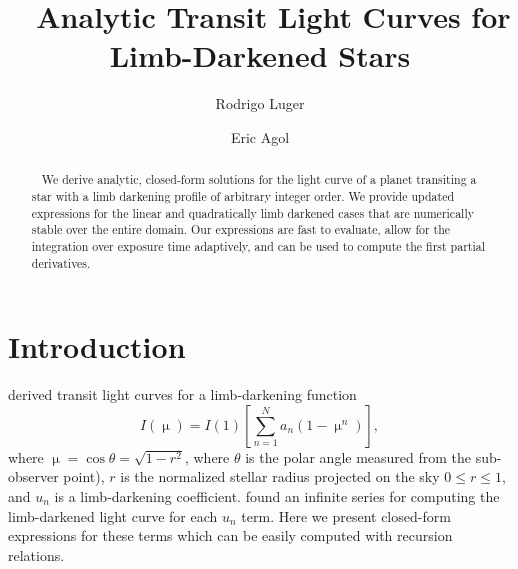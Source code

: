 \documentclass[modern]{aastex61}
\begin{document}

\setlength{\abovedisplayskip}{1.5em}
\setlength{\belowdisplayskip}{1.5em}

\title{%
    Analytic Transit Light Curves for Limb-Darkened Stars
}

\author[0000-0002-0296-3826]{Rodrigo Luger}
\author{Eric Agol}


\begin{abstract}
    We derive analytic, closed-form solutions for the light curve
    of a planet transiting a star with a limb darkening profile of
    arbitrary integer order.  We provide updated expressions for the linear
    and quadratically limb darkened cases that are numerically stable
    over the entire domain.  Our expressions are fast to evaluate,
    allow for the integration over exposure time adaptively, and
    can be used to compute the first partial derivatives.
\end{abstract}

%
\section{Introduction}
\label{sec:intro}

\citet{Gimenez2006} derived transit light curves for a limb-darkening
function
\begin{equation}
I(\upmu) = I(1) \left[\sum_{n=1}^N a_n (1-\upmu^n) \right],
\end{equation}
where $\upmu = \cos{\theta} =\sqrt{1-r^2}$, where $\theta$ is the polar angle measured from the
sub-observer point), $r$ is the normalized stellar radius projected on the sky
$0\le r \le 1$, and $u_n$ is a limb-darkening coefficient.  \cite{Gimenez2006}
found an infinite series for computing the limb-darkened light curve for each $u_n$
term.  Here we present closed-form expressions for these terms which can be
easily computed with recursion relations.
\end{document}

